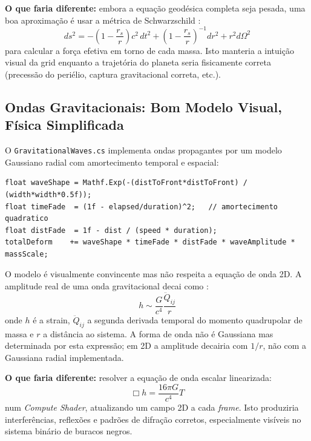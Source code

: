 \documentclass[12pt,a4paper]{article}
\begin{document}
\textbf{O que faria diferente:} embora a equa\c{c}\~{a}o geod\'{e}sica completa seja pesada, uma boa aproxima\c{c}\~{a}o \'{e} usar a m\'{e}trica de Schwarzschild \cite{schwarzschild1916,einstein1916}:
\begin{equation}
ds^2 = -\left(1 - \frac{r_s}{r}\right)c^2\,dt^2 + \left(1-\frac{r_s}{r}\right)^{-1}dr^2 + r^2 d\Omega^2
\end{equation}
para calcular a for\c{c}a efetiva em torno de cada massa. Isto manteria a intui\c{c}\~{a}o visual da grid enquanto a trajet\'{o}ria do planeta seria fisicamente correta (precess\~{a}o do peri\'{e}lio, captura gravitacional correta, etc.).

\subsection{Ondas Gravitacionais: Bom Modelo Visual, F\'{i}sica Simplificada}

O \texttt{GravitationalWaves.cs} implementa ondas propagantes por um modelo Gaussiano radial com amortecimento temporal e espacial:

\begin{lstlisting}[caption={GravitationalWaves.cs - modelo Gaussiano de propagacao de ondas}]
float waveShape = Mathf.Exp(-(distToFront*distToFront) / (width*width*0.5f));
float timeFade  = (1f - elapsed/duration)^2;   // amortecimento quadratico
float distFade  = 1f - dist / (speed * duration);
totalDeform    += waveShape * timeFade * distFade * waveAmplitude * massScale;
\end{lstlisting}

O modelo \'{e} visualmente convincente mas n\~{a}o respeita a equa\c{c}\~{a}o de onda 2D. A amplitude real de uma onda gravitacional decai como \cite{abbott2016,thorne2014}:
\begin{equation}
h \sim \frac{G}{c^4} \frac{\ddot{Q}_{ij}}{r}
\end{equation}
onde $h$ \'{e} a strain, $\ddot{Q}_{ij}$ a segunda derivada temporal do momento quadrupolar de massa e $r$ a dist\^{a}ncia ao sistema. A forma de onda n\~{a}o \'{e} Gaussiana mas determinada por esta express\~{a}o; em 2D a amplitude decairia com $1/r$, n\~{a}o com a Gaussiana radial implementada.

\textbf{O que faria diferente:} resolver a equa\c{c}\~{a}o de onda escalar linearizada:
\begin{equation}
\Box h = \frac{16\pi G}{c^4} T
\end{equation}
num \textit{Compute Shader}, atualizando um campo 2D a cada \textit{frame}. Isto produziria interfer\^{e}ncias, reflex\~{o}es e padr\~{o}es de difra\c{c}\~{a}o corretos, especialmente vis\'{i}veis no sistema bin\'{a}rio de buracos negros.
\end{document}
